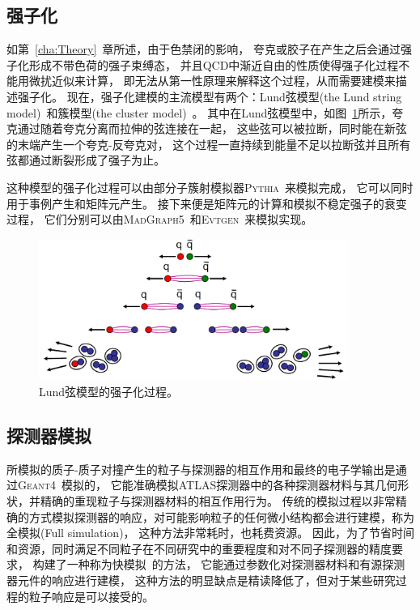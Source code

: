 \subsection{强子化}
\label{sec:MCHARD}
如第~\ref{cha:Theory}~章所述，由于色禁闭的影响，
夸克或胶子在产生之后会通过强子化形成不带色荷的强子束缚态，
并且QCD中渐近自由的性质使得强子化过程不能用微扰近似来计算，
即无法从第一性原理来解释这个过程，从而需要建模来描述强子化。
现在，强子化建模的主流模型有两个：Lund弦模型(the Lund string model)~\cite{Hadonization}和簇模型(the cluster model)~\cite{MC4}。
其中在Lund弦模型中，如图~\ref{fig:MC1}所示，夸克通过随着夸克分离而拉伸的弦连接在一起，
这些弦可以被拉断，同时能在新弦的末端产生一个夸克-反夸克对，
这个过程一直持续到能量不足以拉断弦并且所有弦都通过断裂形成了强子为止。

这种模型的强子化过程可以由部分子簇射模拟器\textsc{Pythia}~\cite{MC5}来模拟完成，
它可以同时用于事例产生和矩阵元产生。
接下来便是矩阵元的计算和模拟不稳定强子的衰变过程，
它们分别可以由\textsc{MadGraph5}~\cite{Alwall:2014hca}和\textsc{Evtgen}~\cite{Lange:2001uf}来模拟实现。

\begin{figure}
  \begin{center}
    \includegraphics[width=0.9\textwidth]{figuresEXP/MC1.jpg}
  \end{center}
  \caption{
Lund弦模型的强子化过程。
  }
    \label{fig:MC1}
\end{figure}


\subsection{探测器模拟}
\label{sec:MCDET}

所模拟的质子-质子对撞产生的粒子与探测器的相互作用和最终的电子学输出是通过\textsc{Geant4}~\cite{MC7}模拟的，
它能准确模拟ATLAS探测器中的各种探测器材料与其几何形状，并精确的重现粒子与探测器材料的相互作用行为。
传统的模拟过程以非常精确的方式模拟探测器的响应，对可能影响粒子的任何微小结构都会进行建模，称为全模拟(Full simulation)，
这种方法非常耗时，也耗费资源。
因此，为了节省时间和资源，同时满足不同粒子在不同研究中的重要程度和对不同子探测器的精度要求，
构建了一种称为快模拟~\cite{MC8}的方法，
它能通过参数化对探测器材料和有源探测器元件的响应进行建模，
这种方法的明显缺点是精读降低了，但对于某些研究过程的粒子响应是可以接受的。



